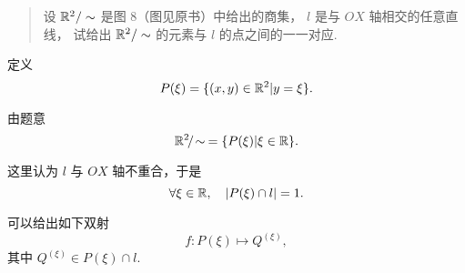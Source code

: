 \begin{quotation}
    设 $\mathbb{R}^2 / \sim$ 是图 8（图见原书）中给出的商集，
    $l$ 是与 $OX$ 轴相交的任意直线，
    试给出 $\mathbb{R}^2 / \sim$ 的元素与 $l$ 的点之间的一一对应.
\end{quotation}

定义
\begin{equation}
    P(\xi) = \{ (x, y) \in \mathbb{R}^2 | y = \xi \}.
\end{equation}

由题意
\begin{equation}
    \mathbb{R}^2\!/\!\sim \:= \{ P(\xi) | \xi \in \mathbb{R} \}.
\end{equation}

这里认为 $l$ 与 $OX$ 轴不重合，于是
\begin{equation}
    \forall \xi \in \mathbb{R}, \quad
    | P(\xi) \cap l | = 1.
\end{equation}

可以给出如下双射
\begin{equation}
    f: P(\xi) \mapsto Q^{(\xi)},
\end{equation}
其中 $Q^{(\xi)} \in P(\xi) \cap l$.


